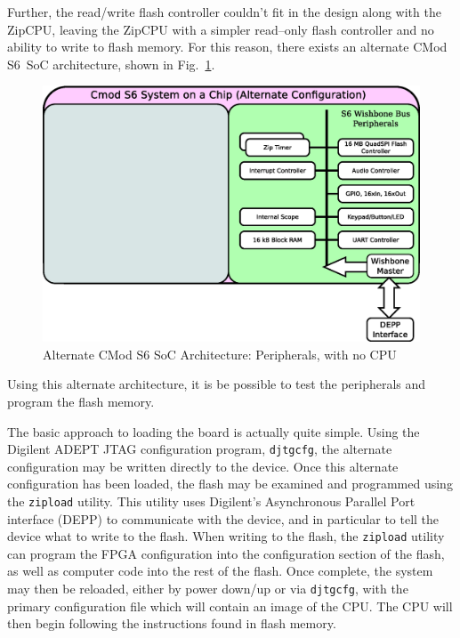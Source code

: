 \documentclass{gqtekspec}
\begin{document}
Further, the read/write flash controller couldn't fit in the design along
with the ZipCPU, leaving the ZipCPU with a simpler read--only flash controller
and no ability to write to flash memory.  For this reason, there exists an
alternate CMod S6~SoC architecture, shown in Fig.~\ref{fig:altarchitecture}.
\begin{figure}\begin{center}
\includegraphics[width=5in]{../gfx/altbones.eps}
\caption{Alternate CMod S6 SoC Architecture: Peripherals, with no
	CPU}\label{fig:altarchitecture}
\end{center}\end{figure}
Using this alternate architecture, it is be possible to test the peripherals
and program the flash memory.

The basic approach to loading the board is actually quite simple.  Using the
Digilent ADEPT JTAG configuration program, {\tt djtgcfg}, the alternate
configuration may be written directly to the device.  Once this alternate
configuration has been loaded, the flash may be examined and programmed using
the {\tt zipload} utility.  This utility uses Digilent's Asynchronous Parallel
Port interface (DEPP) to communicate with the device, and in particular to
tell the device what to write to the flash.  When writing to the flash,
the {\tt zipload} utility can program the FPGA configuration into the
configuration section of the flash, as well as computer code into the rest of
the flash.  Once complete, the system may then be reloaded, either by power
down/up or via {\tt djtgcfg}, with the primary configuration file which will
contain an image of the CPU.  The CPU will then begin following the
instructions found in flash memory.
\end{document}

